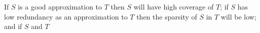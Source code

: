 \documentclass{bioinfo}
\begin{document}
\begin{methods}
If $S$ is a good approximation to $T$ then $S$ will have high coverage
of $T$; if $S$ has low redundancy as an approximation to $T$ then the
sparsity of $S$ in $T$ will be low; and if $S$ and $T$ 







\end{methods}
\end{document}
